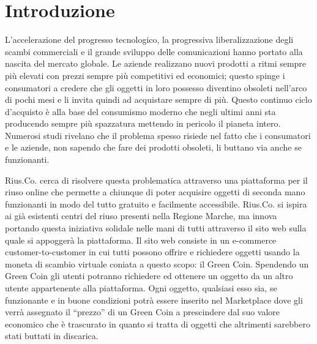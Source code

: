 \section{Introduzione}
L'accelerazione del progresso tecnologico, la progressiva liberalizzazione degli scambi commerciali e il grande sviluppo delle comunicazioni hanno portato alla nascita del mercato globale. Le aziende realizzano nuovi prodotti a ritmi sempre più elevati con prezzi sempre più competitivi ed economici; questo spinge i consumatori a credere che gli oggetti in loro possesso diventino obsoleti nell'arco di pochi mesi e li invita quindi ad acquistare sempre di più. Questo continuo ciclo d'acquisto è alla base del consumismo moderno che negli ultimi anni sta producendo sempre più spazzatura mettendo in pericolo il pianeta intero. Numerosi studi rivelano che il problema spesso risiede nel fatto che i consumatori e le aziende, non sapendo che fare dei prodotti obsoleti, li buttano via anche se funzionanti. 
\medskip

Rius.Co. cerca di risolvere questa problematica attraverso una piattaforma per il riuso online che permette a chiunque di poter acquisire oggetti di seconda mano funzionanti in modo del tutto gratuito e facilmente accessibile. Rius.Co. si ispira ai già esistenti centri del riuso presenti nella Regione Marche, ma innova portando questa iniziativa solidale nelle mani di tutti attraverso il sito web sulla quale si appoggerà la piattaforma. Il sito web consiste in un e-commerce customer-to-customer in cui tutti possono offrire e richiedere oggetti usando la moneta di scambio virtuale coniata a questo scopo: il Green Coin. Spendendo un Green Coin gli utenti potranno richiedere ed ottenere un oggetto da un altro utente appartenente alla piattaforma. Ogni oggetto, qualsiasi esso sia, se funzionante e in buone condizioni potrà essere inserito nel Marketplace dove gli verrà assegnato il “prezzo” di un Green Coin a prescindere dal suo valore economico che è trascurato in quanto si tratta di oggetti che altrimenti sarebbero stati buttati in discarica. 
\bigskip
\bigskip

